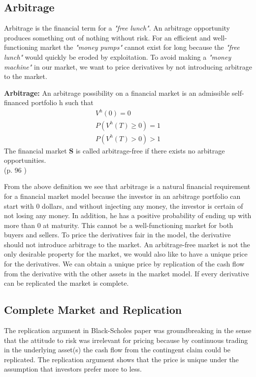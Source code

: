 \subsection{Arbitrage}
Arbitrage is the financial term for a \textsl{"free lunch"}. An arbitrage opportunity produces something out of nothing without risk. For an efficient and well-functioning market the \textsl{"money pumps"} cannot exist for long because the \textsl{"free lunch"} would quickly be eroded by exploitation. To avoid making a \textsl{"money machine"} in our market, we want to price derivatives by not introducing arbitrage to the market.  
\theoremstyle{definition}
\begin{definition}{\textbf{Arbitrage: }}\label{Arbitrage}
An arbitrage possibility on a financial market is an admissible self-financed portfolio h such that
\begin{equation*}
\begin{split}
V^{h}(0)=0\\
P(V^{h}(T)\geq 0)=1\\
P(V^{h}(T)>0)>1
\end{split}
\end{equation*}
The financial market $\bm{S}$ is called arbitrage-free if there exists no arbitrage opportunities.\\
\null \hfill (p. 96 \parencite{finKont})
\end{definition}
From the above definition we see that arbitrage is a natural financial requirement for a financial market model because the investor in an arbitrage portfolio can start with 0 dollars, and without injecting any money, the investor is certain of not losing any money. In addition, he has a positive probability of ending up with more than 0 at maturity. This cannot be a well-functioning market for both buyers and sellers. To price the derivatives fair in the model, the derivative should not introduce arbitrage to the market. An arbitrage-free market is not the only desirable property for the market, we would also like to have a unique price for the derivatives. We can obtain a unique price by replication of the cash flow from the derivative with the other assets in the market model. If every derivative can be replicated the market is complete. 


\subsection{Complete Market and Replication}
The replication argument in Black-Scholes paper \parencite{B-S-Paper} was groundbreaking in the sense that the attitude to risk was irrelevant for pricing because by continuous trading in the underlying asset(s) the cash flow from the contingent claim could be replicated. The replication argument shows that the price is unique under the assumption that investors prefer more to less.\\

